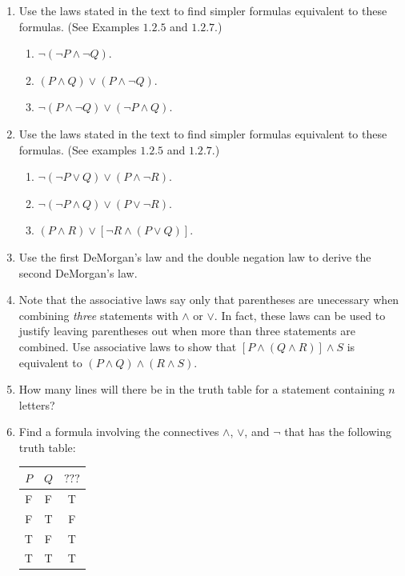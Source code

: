 \begin{enumerate}
\item Use the laws stated in the text to find simpler formulas equivalent to these formulas. (See Examples $1.2.5$ and $1.2.7$.)
  \begin{enumerate}
  \item $\neg (\neg P \land \neg Q)$.
  \item $(P \land Q) \lor (P \land \neg Q)$.
  \item $\neg (P \land \neg Q) \lor (\neg P \land Q)$.
  \end{enumerate}

\item Use the laws stated in the text to find simpler formulas equivalent to these formulas. (See examples $1.2.5$ and $1.2.7$.)
  \begin{enumerate}
  \item $\neg (\neg P \lor Q) \lor (P \land \neg R)$.
  \item $\neg (\neg P \land Q) \lor (P \lor \neg R)$.
  \item $(P \land R) \lor [\neg R \land (P \lor Q)]$.
  \end{enumerate}

\item Use the first DeMorgan's law and the double negation law to derive the second DeMorgan's law.

\item Note that the associative laws say only that parentheses are unecessary when combining \emph{three} statements with $\land$ or $\lor$. In fact, these laws can be used to justify leaving parentheses out when more than three statements are combined. Use associative laws to show that $[P \land (Q \land R)] \land S$ is equivalent to $(P \land Q) \land (R \land S)$.

\item How many lines will there be in the truth table for a statement containing $n$ letters?

\item Find a formula involving the connectives $\land$, $\lor$, and $\neg$ that has the following truth table:
  \begin{center}
    \begin{tabular}{ccc}
      $P$ & $Q$ & $???$ \\
      \midrule
      F & F & T \\
      F & T & F \\
      T & F & T \\
      T & T & T
    \end{tabular}
  \end{center}


\end{enumerate}
